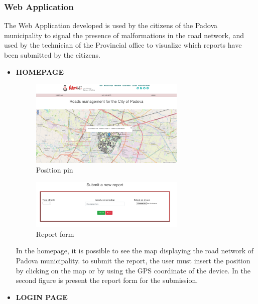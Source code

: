  \subsubsection{Web Application}
 The Web Application developed is used by the citizens of the Padova municipality to signal the presence of malformations in the road network, and used by the technician of the Provincial office to visualize which reports have been submitted by the citizens. 
 \begin{itemize}
    \newpage
     \item \textbf{HOMEPAGE}
      \begin{figure}[h]
        \centering
        \includegraphics[width=0.7\textwidth]{images/homepage.jpeg}
        \caption{Position pin}
       \end{figure}
       \begin{figure}[h]
        \centering
        \includegraphics[width=0.7\textwidth]{images/report.png}
        \caption{Report form}
       \end{figure}

 In the homepage, it is possible to see the map displaying the road network of Padova municipality.
 to submit the report, the user must insert the position by clicking on the map or by using the GPS coordinate of the device.
 In the second figure is present the report form for the submission.

\newpage
    \item \textbf{LOGIN PAGE}
    

\end{itemize}
